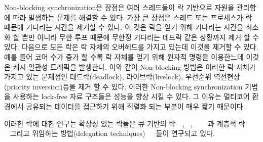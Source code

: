 
Non-blocking synchronization은 장점은 여러 스레드들이 락 기반으로 자원을 관리함에 따라
 발생하는 문제를 해결할 수 있다. 
가장 큰 장점은 스레드 또는 프로세스가 락 때문에 기다리는 시간을 제거할 수 있다.
이 것은 락을 얻기 위해 기다리는 시간을 최소화 할 뿐만 아니라 무한 루프 때문에 무한정 기다리는 
데드락 같은 상황까지 제거 할 수 있다. 
다음으로 모든 락은 락 자체의 오버헤드를 가지고 있는데 이것을 제거할 수 있다. 
예를 들어 코어 수가 증가 할 수록 락 자체를 얻기 위해 원자적 명령을 이용한느데 이것은 캐시 일관성 트래픽을 
발생한다. 
이와 같이 Non-blocking 방법은 이러한 락 자체가 가지고 있는 문제점인 데드락(deadlock), 라이브락(livelock), 
우선순위 역전현상(priority inversion)등을 제거 할 수 있다. 
이러한 Non-blocking synchronization 기법을 사용하는 lock-free 자료 구조들은 성능을 향상 시킬 수 있다. 
그 이유는 멀티코어 환경에서 공유되는 데이터를 접근하기 위해 직렬화 되는 부분이 매우 짧기 때문이다. 




  


이러한 락에 대한 연구는 확장성 있는 락들은 큐 기반의
락~\cite{MellorCrummey1991MCS}~\cite{Magnusson1994QLC}, ~\cite{Wang2016BeMyGuest},
~\cite{Scott2013SS}
~\cite{Bueso2014MCS}~\cite{Bueso2015STP}과 계층적
락~\cite{Radovic2003HBL}~\cite{Chabbi2016CLL}~\cite{Luchangco2006HCQ}
~\cite{Chabbi2015HPL} 그리고 위임하는 방법(delegation
techniques)~\cite{Hendler2010FC}~\cite{Fatourou2012RCS}~\cite{Delegation2014}들이
연구되고 있다. 

